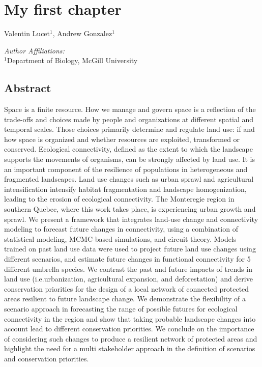 \chapter{My first chapter}
\begin{center}
{Valentin Lucet$^{1}$, Andrew Gonzalez$^{1}$}\\
\end{center}
\textit{Author Affiliations:}\\
\normalsize{$^{1}$Department of Biology, McGill University}\\
\section{Abstract}

Space is a finite resource. How we manage and govern space is a reflection of the trade-offs and choices made by people and organizations at different spatial and temporal scales. Those choices primarily determine and regulate land use: if and how space is organized and whether resources are exploited, transformed or conserved. Ecological connectivity, defined as the extent to which the landscape supports the movements of organisms, can be strongly affected by land use. It is an important component of the resilience of populations in heterogeneous and fragmented landscapes. Land use changes such as urban sprawl and agricultural intensification intensify habitat fragmentation and landscape homogenization, leading to the erosion of ecological connectivity. The Monteregie region in southern Quebec, where this work takes place, is experiencing urban growth and sprawl. We present a framework that integrates land-use change and connectivity modeling to forecast future changes in connectivity, using a combination of statistical modeling, MCMC-based simulations, and circuit theory. Models trained on past land use data were used to project future land use changes using different scenarios, and estimate future changes in functional connectivity for 5 different umbrella species. We contrast the past and future impacts of trends in land use (i.e.urbanization, agricultural expansion, and deforestation) and derive conservation priorities for the design of a local network of connected protected areas resilient to future landscape change. We demonstrate the flexibility of a scenario approach in forecasting the range of possible futures for ecological connectivity in the region and show that taking probable landscape changes into account lead to different conservation priorities. We conclude on the importance of considering such changes to produce a resilient network of protected areas and highlight the need for a multi stakeholder approach in the definition of scenarios and conservation priorities.

